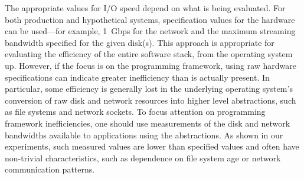 The appropriate values for I/O speed depend on what is being evaluated.
For both production and hypothetical systems, specification values
for the hardware can be used---for example, 1~Gbps for the network
and the maximum streaming bandwidth specified for the given disk(s).
This approach is appropriate for evaluating the efficiency of the
entire software stack, from the operating system up.
However, if the focus is on the programming framework, using raw
hardware specifications can indicate greater inefficiency than is
actually present.
In particular, some efficiency is generally lost in the underlying
operating system's conversion of raw disk and network resources into
higher level abstractions, such as file systems and network sockets.
To focus attention on programming framework inefficiencies,
one should use measurements of the disk and network bandwidths available
to applications using the abstractions.
As shown in our experiments, such measured values are lower than
specified values and often have non-trivial characteristics, such as
dependence on file system age or network communication patterns.

